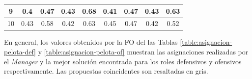 \begin{table}[H]
\begin{tabular}{| c | c | c| c | c | c | c | c | c |}
		9                               & 0.4        & 0.47                & \cellcolor{gray!30} 0.43 & \cellcolor{gray!30} 0.68 & 0.41       & 0.47                & 0.43       & 0.63                \\ \hline
		10                              & 0.43       & 0.58                & 0.42                     & 0.63                     & 0.45       & 0.47                & 0.42       & 0.52                \\ \bottomrule
	\end{tabular}
\end{table}

En general, los valores obtenidos por la FO del las Tablas \ref{table:asignacion-pelota-def} y \ref{table:asignacion-pelota-of} muestran las asignaciones realizadas por el \textit{Manager} y la mejor solución encontrada para los roles defensivos y ofensivos respectivamente. Las propuestas coincidentes son resaltadas en gris. 

\begin{table}[H]
	\centering
	\caption{Resultado de la asignación de la mejor solución encontrada para los roles defensivos}\label{table:asignacion-pelota-def}
\end{table}

